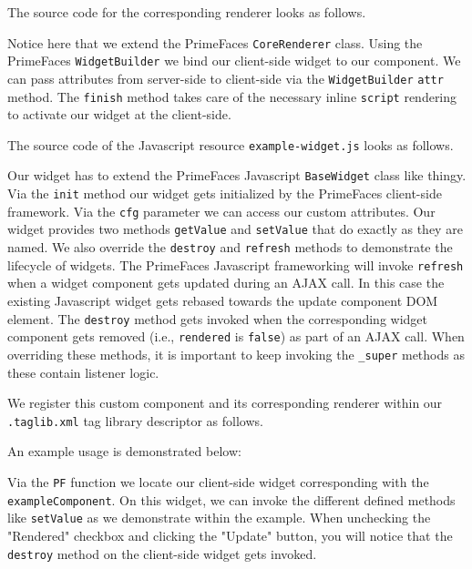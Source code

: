 The source code for the corresponding renderer looks as follows.

Notice here that we extend the PrimeFaces \texttt{CoreRenderer} class.
Using the PrimeFaces \texttt{WidgetBuilder} we bind our client-side widget to our component.
We can pass attributes from server-side to client-side via the \texttt{WidgetBuilder} \texttt{attr} method.
The \texttt{finish} method takes care of the necessary inline \texttt{script} rendering to activate our widget at the client-side.

The source code of the Javascript resource \texttt{example-widget.js} looks as follows.

Our widget has to extend the PrimeFaces Javascript \texttt{BaseWidget} class like thingy.
Via the \texttt{init} method our widget gets initialized by the PrimeFaces client-side framework.
Via the \texttt{cfg} parameter we can access our custom attributes.
Our widget provides two methods \texttt{getValue} and \texttt{setValue} that do exactly as they are named.
We also override the \texttt{destroy} and \texttt{refresh} methods to demonstrate the lifecycle of widgets.
The PrimeFaces Javascript frameworking will invoke \texttt{refresh} when a widget component gets updated during an AJAX call.
In this case the existing Javascript widget gets rebased towards the update component DOM element.
The \texttt{destroy} method gets invoked when the corresponding widget component gets removed (i.e., \texttt{rendered} is \texttt{false}) as part of an AJAX call.
When overriding these methods, it is important to keep invoking the \texttt{\_super} methods as these contain listener logic.

We register this custom component and its corresponding renderer within our \texttt{.taglib\allowbreak .xml} tag library descriptor as follows.


An example usage is demonstrated below:

Via the \texttt{PF} function we locate our client-side widget corresponding with the \texttt{example\allowbreak Component}.
On this widget, we can invoke the different defined methods like \texttt{setValue} as we demonstrate within the example.
When unchecking the "Rendered" checkbox and clicking the "Update" button, you will notice that the \texttt{destroy} method on the client-side widget gets invoked.

